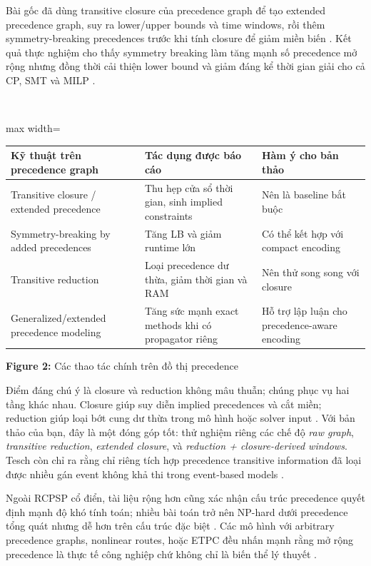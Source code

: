 Bài gốc đã dùng transitive closure của precedence graph để tạo extended precedence graph, suy ra lower/upper bounds và time windows, rồi thêm symmetry-breaking precedences trước khi tính closure để giảm miền biến  \cite{Bofill2022The}. Kết quả thực nghiệm cho thấy symmetry breaking làm tăng mạnh số precedence mở rộng nhưng đồng thời cải thiện lower bound và giảm đáng kể thời gian giải cho cả CP, SMT và MILP  \cite{Bofill2022The}.


\mbox{}\\
\begin{adjustbox}{max width=\textwidth}
\begin{tabular}{p{5.3cm} | p{5.3cm} | p{5.3cm}}
\hline
Kỹ thuật trên precedence graph & Tác dụng được báo cáo & Hàm ý cho bản thảo \\
\hline
Transitive closure / extended precedence & Thu hẹp cửa sổ thời gian, sinh implied constraints  \cite{Bofill2022The} & Nên là baseline bắt buộc \\
Symmetry-breaking by added precedences & Tăng LB và giảm runtime lớn  \cite{Bofill2022The} & Có thể kết hợp với compact encoding \\
Transitive reduction & Loại precedence dư thừa, giảm thời gian và RAM  \cite{Meng2023Transitive} & Nên thử song song với closure \\
Generalized/extended precedence modeling & Tăng sức mạnh exact methods khi có propagator riêng  \cite{Schnell2015On} & Hỗ trợ lập luận cho precedence-aware encoding \\
\hline
\end{tabular}
\end{adjustbox}


\textbf{Figure 2:} Các thao tác chính trên đồ thị precedence


Điểm đáng chú ý là closure và reduction không mâu thuẫn; chúng phục vụ hai tầng khác nhau. Closure giúp suy diễn implied precedences và cắt miền; reduction giúp loại bớt cung dư thừa trong mô hình hoặc solver input  \cite{Meng2023Transitive}. Với bản thảo của bạn, đây là một đóng góp tốt: thử nghiệm riêng các chế độ \textit{raw graph}, \textit{transitive reduction}, \textit{extended closure}, và \textit{reduction + closure-derived windows}. Tesch còn chỉ ra rằng chỉ riêng tích hợp precedence transitive information đã loại được nhiều gán event không khả thi trong event-based models  \cite{Tesch2020A}.


Ngoài RCPSP cổ điển, tài liệu rộng hơn cũng xác nhận cấu trúc precedence quyết định mạnh độ khó tính toán; nhiều bài toán trở nên NP-hard dưới precedence tổng quát nhưng dễ hơn trên cấu trúc đặc biệt  \cite{Prot2017A} \cite{Lenstra1978Complexity}. Các mô hình với arbitrary precedence graphs, nonlinear routes, hoặc ETPC đều nhấn mạnh rằng mở rộng precedence là thực tế công nghiệp chứ không chỉ là biến thể lý thuyết  \cite{Kasapidis2023On} \cite{Fan2021Genetic}.



